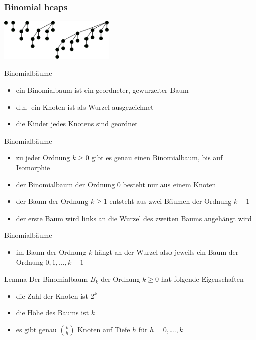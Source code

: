 \documentclass[aspectratio=1610, 11pt]{beamer}
\newcommand{\mytitle}{Binomial heaps}
\begin{document}
\begin{frame}\frametitle{\mytitle}
	\hfill\includegraphics[height=20mm]{images/bintree.pdf}
	\begin{overprint}
		\begin{exampleblock}{Binomialb\"aume}
			\begin{itemize}
				\item ein Binomialbaum ist ein geordneter, gewurzelter Baum
				\item d.h.\ ein Knoten ist als Wurzel ausgezeichnet
				\item die Kinder jedes Knotens sind geordnet
			\end{itemize}
		\end{exampleblock}
		\begin{exampleblock}{Binomialb\"aume}
			\begin{itemize}
				\item zu jeder \alert{Ordnung} $k\geq0$ gibt es genau einen Binomialbaum, bis auf Isomorphie
				\item der Binomialbaum der Ordnung $0$ besteht nur aus einem Knoten
				\item der Baum der Ordnung $k\geq1$ entsteht aus zwei B\"aumen der Ordnung $k-1$
				\item der erste Baum wird links an die Wurzel des zweiten Baums angeh\"angt wird
			\end{itemize}
		\end{exampleblock}
		\begin{exampleblock}{Binomialb\"aume}
			\begin{itemize}
				\item im Baum der Ordnung $k$ h\"angt an der Wurzel also jeweils ein Baum der Ordnung $0,1,\ldots,k-1$
			\end{itemize}
		\end{exampleblock}
		\begin{block}{Lemma}
			Der Binomialbaum $B_k$ der Ordnung $k\geq0$ hat folgende Eigenschaften
			\begin{itemize}
				\item die Zahl der Knoten ist $2^k$
				\item die H\"ohe des Baums ist $k$
				\item es gibt genau $\binom kh$ Knoten auf Tiefe $h$ f\"ur $h=0,\ldots,k$

\end{itemize}
\end{block}
\end{overprint}
\end{frame}
\end{document}
